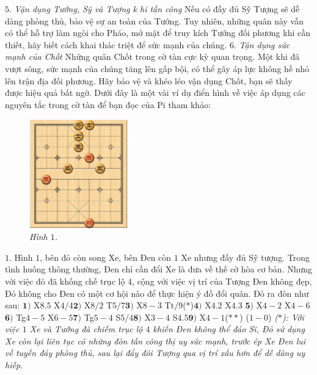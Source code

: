 \begin{multicols}{2}
	\vskip 0.1cm
	$5.$ \textit{Vận dụng Tướng, Sỹ và Tượng k hi tấn công}
	\vskip 0.1cm
	Nếu có đầy đủ Sỹ Tượng sẽ dễ dàng phòng thủ, bảo vệ sự an toàn của Tướng. Tuy nhiên, những quân này vẫn có thể hỗ trợ làm ngòi cho Pháo, mở mặt để truy kích Tướng đối phương khi cần thiết, hãy biết cách khai thác triệt để sức mạnh của chúng.
	\vskip 0.1cm
	$6.$ \textit{Tận dụng sức mạnh của Chốt}
	\vskip 0.1cm
	Những quân Chốt trong cờ tàn cực kỳ quan trọng. Một khi đã vượt sông, sức mạnh của chúng tăng lên gấp bội, có thể gây áp lực không hề nhỏ lên trận địa đối phương. Hãy bảo vệ và khéo léo vận dụng Chốt, bạn sẽ thấy được hiệu quả bất ngờ.
	\vskip 0.1cm
	Dưới đây là một vài ví dụ điển hình về việc áp dụng các nguyên tắc trong cờ tàn để bạn đọc của Pi tham khảo:
	\begin{figure}[H]
		\vspace*{-5pt}
		\centering
		\captionsetup{labelformat= empty, justification=centering}
		\includegraphics[width= 0.38\textwidth]{1}
		\caption{\small\textit{\color{gocco}Hình $1$.}}
		\vspace*{-10pt}
	\end{figure}
	$1$. Hình $1$, bên đỏ còn song Xe, bên Đen còn $1$ Xe nhưng đầy đủ Sỹ tượng. Trong tình huống thông thường, Đen chỉ cần đổi Xe là đưa về thế cờ hòa cơ bản. Nhưng với việc đỏ đã khống chế trục lộ $4$, cộng với việc vị trí của Tượng Đen không đẹp, Đỏ không cho Đen có một cơ hội nào để thực hiện ý đồ đổi quân. Đỏ ra đòn như sau:
	\vskip 0.1cm
	$\pmb{1)}$	X$8.5$ X$4/4$\quad $\pmb{2)}$ X$8/2$  T$5/7$\quad $\pmb{3)}$ X$8-3$ Tt$/9$($*$)\quad $\pmb{4)}$ X$4.2$ X$4.3$ \quad$\pmb{5)}$ X$4-2$ X$4-6$\quad $\pmb{6)}$ Tg$4-5$ X$6-5$\quad $\pmb{7)}$ Tg$5-4$ S$5/4$\quad $\pmb{8)}$ X$3-4$ S$4.5$\quad $\pmb{9)}$ X$4-1$($**$) ($1-0$)
	\vskip 0.1cm 
	\textit{($*$): Với việc $1$ Xe và Tướng đã chiếm trục lộ $4$ khiến Đen không thể đảo Sĩ, Đỏ sử dụng Xe còn lại liên tục có những đòn tấn công thị uy sức mạnh, trước ép Xe Đen lui về tuyến đáy phòng thủ, sau lại đẩy đôi Tượng qua vị trí xấu hơn để dễ dàng uy hiếp.
}
\end{multicols}
